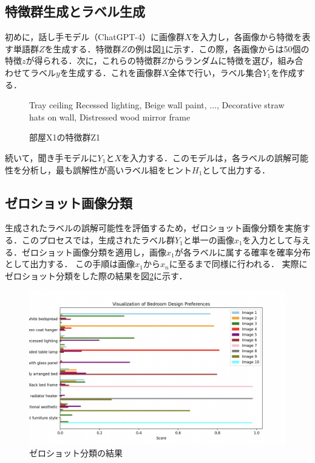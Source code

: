 \documentclass[a4paper,11pt]{jreport}
\begin{document}
\subsection{特徴群生成とラベル生成}
初めに，話し手モデル（ChatGPT-4）に画像群$X$を入力し，各画像から特徴を表す単語群$Z$を生成する．特徴群$Z$の例は図\ref{fig:feature_group}に示す．この際，各画像からは50個の特徴$z$が得られる．次に，これらの特徴群$Z$からランダムに特徴を選び，組み合わせてラベル$y$を生成する．これを画像群$X$全体で行い，ラベル集合$Y_1$を作成する．

\begin{figure}[H]
\begin{mdframed}[linewidth=1pt]
Tray ceiling Recessed lighting, Beige wall paint, ..., Decorative straw hats on wall, Distressed wood mirror frame
\end{mdframed}
\caption{部屋X1の特徴群Z1}
\label{fig:feature_group}
\end{figure}

続いて，聞き手モデルに$Y_1$と$X$を入力する．このモデルは，各ラベルの誤解可能性を分析し，最も誤解性が高いラベル組をヒント$H_1$として出力する．
\subsection{ゼロショット画像分類}
生成されたラベルの誤解可能性を評価するため，ゼロショット画像分類を実施する．このプロセスでは，生成されたラベル群$Y_1$と単一の画像$x_1$を入力として与える．ゼロショット画像分類を適用し，画像$x_1$が各ラベルに属する確率を確率分布として出力する．
この手順は画像$x_1$から$x_n$に至るまで同様に行われる．
実際にゼロショット分類をした際の結果を図\ref{fig:zeroshot_result}に示す．
\begin{figure}[H]
  \centering
  \includegraphics[width=\linewidth]{figures/zeroshot_result.png}
  \caption{ゼロショット分類の結果}
  \label{fig:zeroshot_result}
\end{figure}
\end{document}
